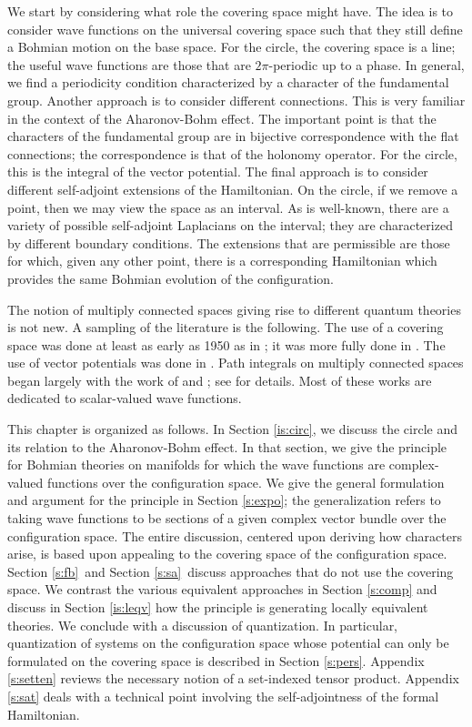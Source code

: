 \documentclass[11pt]{article}
\theoremstyle{remark}
\begin{document}
We start by considering what role the covering space might have. 
The idea is to consider wave functions
on the universal covering space such that they still define a Bohmian
motion on the base space. For the circle, the covering space is a
line; the useful wave functions are those that are $2\pi$-periodic up to a
phase. In general, we find a periodicity condition 
 characterized by a character of the fundamental
group. Another approach is to consider different connections. This is
very familiar in the context of the Aharonov-Bohm effect. The
important point is that the characters of the fundamental group are in
bijective correspondence with the flat connections; the correspondence
is that of the holonomy operator. For the circle, this is the integral
of the vector potential. The final approach is to consider
different self-adjoint extensions of the Hamiltonian. 
On the circle, if we remove a
point, then we may view the space as an interval. As is well-known,
there are a variety of possible self-adjoint Laplacians on the
interval; they are 
characterized by different boundary conditions. The extensions that
are permissible are those for which, given any other point, there is a
corresponding Hamiltonian which provides the same Bohmian evolution of
the configuration. 


The notion of multiply connected spaces giving rise to different
quantum theories is not new. A sampling of the literature is the
following. The use of a covering space was done at
least as early as 1950 as in \cite{BH50}; it was more fully done in
\cite{D72}. 
The use of vector potentials was done
 in \cite{AB59}. Path integrals on multiply connected
spaces began largely with the work of \cite{S68} and \cite{DL71}; see
\cite{Sch81} for details. 
Most of these works are dedicated to scalar-valued wave functions.


This chapter is organized as follows. 
In Section {\ref{is:circ}}, we discuss the circle and its relation to 
the Aharonov-Bohm effect. In that section, we give the principle for
Bohmian theories on manifolds for which the wave functions are complex-valued
functions over the configuration space. 
We give the
general formulation and argument for the principle in
Section {\ref{s:expo}}; the generalization refers to taking wave functions to be
sections of a given complex vector bundle over the configuration space. 
The entire discussion, centered upon deriving how
characters arise, is based upon appealing to the covering
space of the configuration space.
Section {\ref{s:fb}}\ and Section {\ref{s:sa}}\ discuss approaches that do
not use the covering space.
We  contrast the various equivalent approaches in
Section {\ref{s:comp}} and discuss in Section {\ref{is:leqv}}
 how the principle is generating
locally equivalent theories. 
We conclude with a discussion of quantization. 
In particular, quantization of 
systems on the configuration space whose potential can
only be formulated on the covering space is described in
Section {\ref{s:pers}}.  Appendix \ref{s:setten} reviews the
necessary notion of a set-indexed tensor
product. Appendix \ref{s:sat}  
deals with a technical point involving the self-adjointness of the
formal Hamiltonian. 
\end{document}
